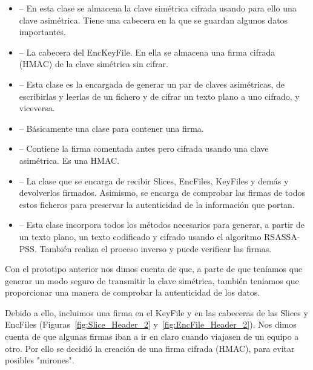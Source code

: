 \begin{itemize}
  \item {} -- En esta clase se almacena la clave simétrica
  cifrada usando para ello una clave asimétrica. Tiene una cabecera en la que
  se guardan algunos datos importantes.

  \item {} -- La cabecera del EncKeyFile. En ella se
  almacena una firma cifrada (HMAC) de la clave simétrica sin cifrar.

  \item {} -- Esta clase es la encargada de generar un par de
  claves asimétricas, de escribirlas y leerlas de un fichero y de cifrar
  un texto plano a uno cifrado, y viceversa.

  \item {} -- Básicamente una clase para contener una firma.

  \item {} -- Contiene la firma comentada antes pero
  cifrada usando una clave asimétrica. Es una HMAC.

  \item {} -- La clase que se encarga de recibir Slices, EncFiles,
  KeyFiles y demás y devolverlos firmados. Asimismo, se encarga de comprobar
  las firmas de todos estos ficheros para preservar la autenticidad de la
  información que portan.

  \item {} -- Esta clase incorpora todos los métodos necesarios
  para generar, a partir de un texto plano, un texto codificado y cifrado
  usando el algoritmo RSASSA-PSS. También realiza el proceso inverso y puede
  verificar las firmas.
\end{itemize}

Con el prototipo anterior nos dimos cuenta de que, a parte de que teníamos que
generar un modo seguro de transmitir la clave simétrica, también teniamos que
proporcionar una manera de comprobar la autenticidad de los datos.

Debido a ello, incluimos una firma en el KeyFile y en las cabeceras de las
Slices y EncFiles (Figuras~\ref{fig:Slice_Header_2} y~\ref{fig:EncFile_Header_2}).
Nos dimos cuenta de que algunas firmas iban a ir en claro cuando viajasen de un
equipo a otro. Por ello se decidió la creación de una firma cifrada (HMAC),
para evitar posibles "mirones".

